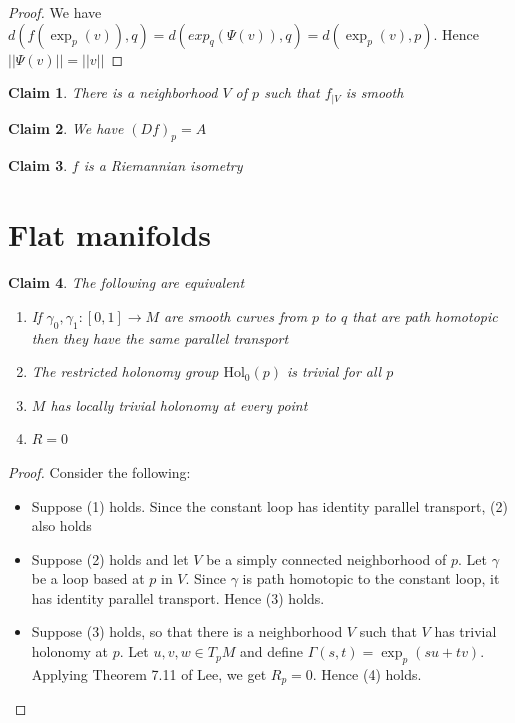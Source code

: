 \documentclass[a4paper,11pt]{article}
\newtheorem{claim}{Claim}
\begin{document}
\begin{proof}
 We have $d(f(\exp_p(v)),q)=d(exp_q(\Psi(v)),q)=d(\exp_p(v),p)$. Hence $||\Psi(v)||=||v||$
\end{proof}

\begin{claim}
  There is a neighborhood $V$ of $p$ such that $f_{|V}$ is smooth
\end{claim}

\begin{claim}
  We have $(Df)_p=A$
\end{claim}

\begin{claim}
  $f$ is a Riemannian isometry
\end{claim}

\section{Flat manifolds}

\begin{claim}
  The following are equivalent
  \begin{enumerate}
    \item If $\gamma_0,\gamma_1:[0,1] \to M$ are smooth curves from $p$ to $q$ that are path homotopic then they have the same parallel transport
    \item The restricted holonomy group $\text{Hol}_0(p)$ is trivial for all $p$
    \item $M$ has locally trivial holonomy at every point
    \item $R=0$ 
  \end{enumerate}
\end{claim}

\begin{proof}
  Consider the following:
  \begin{itemize}
    \item Suppose (1) holds.
          Since the constant loop has identity parallel transport, (2) also holds
    
    \item Suppose (2) holds and let $V$ be a simply connected neighborhood of $p$. 
          Let $\gamma$ be a loop based at $p$ in $V$. 
          Since $\gamma$ is path homotopic to the constant loop, it has identity parallel transport.
          Hence (3) holds.
          
    \item Suppose (3) holds, so that there is a neighborhood $V$ such that $V$ has trivial holonomy at $p$.
          Let $u,v,w \in T_pM$ and define $\Gamma(s,t)=\exp_p(su+tv)$. 
          Applying Theorem 7.11 of Lee, we get $R_p=0$. Hence (4) holds.
  \end{itemize}  
\end{proof}
\end{document}
